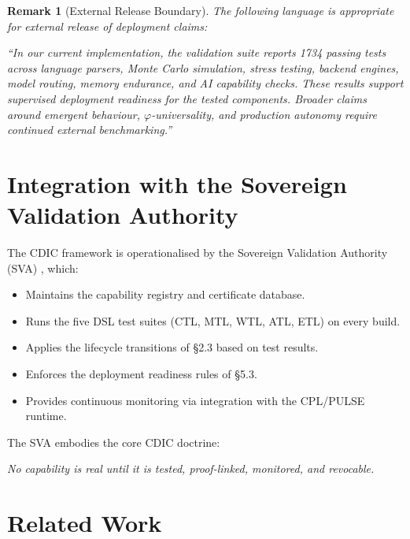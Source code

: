 \documentclass[11pt,a4paper]{article}
\newtheorem{remark}{Remark}
\begin{document}
\begin{remark}[External Release Boundary]
The following language is appropriate for external release of deployment claims:

\emph{``In our current implementation, the validation suite reports 1734 passing tests
across language parsers, Monte Carlo simulation, stress testing, backend engines, model
routing, memory endurance, and AI capability checks.  These results support supervised
deployment readiness for the tested components.  Broader claims around emergent
behaviour, $\varphi$-universality, and production autonomy require continued external
benchmarking.''}
\end{remark}

\section{Integration with the Sovereign Validation Authority}
\label{sec:sva_integration}

The CDIC framework is operationalised by the Sovereign Validation Authority (SVA)
\cite{nova_sva}, which:

\begin{itemize}[noitemsep]
  \item Maintains the capability registry and certificate database.
  \item Runs the five DSL test suites (CTL, MTL, WTL, ATL, ETL) on every build.
  \item Applies the lifecycle transitions of §2.3 based on test results.
  \item Enforces the deployment readiness rules of §5.3.
  \item Provides continuous monitoring via integration with the CPL/PULSE runtime.
\end{itemize}

The SVA embodies the core CDIC doctrine:

\begin{center}
\emph{No capability is real until it is tested, proof-linked, monitored, and revocable.}
\end{center}

\section{Related Work}
\label{sec:related}
\end{document}
